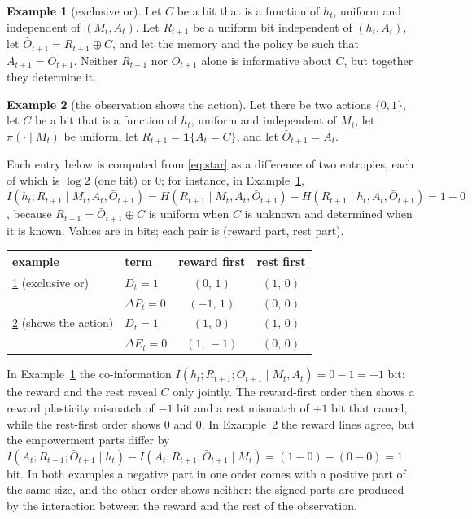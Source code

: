 \documentclass{article}
\theoremstyle{definition}
\newtheorem{example}{Example}
\theoremstyle{remark}
\newcommand{\dE}{\Delta E}
\newcommand{\dP}{\Delta P}
\newcommand{\Ob}{\bar O}
\begin{document}
\begin{example}[exclusive or]\label{ex:xor}
Let $C$ be a bit that is a function of $h_t$, uniform and independent of $(M_t,A_t)$. Let $R_{t+1}$ be a uniform bit independent of $(h_t,A_t)$, let $\Ob_{t+1}=R_{t+1}\oplus C$, and let the memory and the policy be such that $A_{t+1}=\Ob_{t+1}$. Neither $R_{t+1}$ nor $\Ob_{t+1}$ alone is informative about $C$, but together they determine it.
\end{example}

\begin{example}[the observation shows the action]\label{ex:show}
Let there be two actions $\{0,1\}$, let $C$ be a bit that is a function of $h_t$, uniform and independent of $M_t$, let $\pi(\cdot\mid M_t)$ be uniform, let $R_{t+1}=\mathbf 1\{A_t=C\}$, and let $\Ob_{t+1}=A_t$.
\end{example}

Each entry below is computed from \eqref{eq:star} as a difference of two entropies, each of which is $\log2$ (one bit) or $0$; for instance, in Example~\ref{ex:xor}, $I(h_t;R_{t+1}\mid M_t,A_t,\Ob_{t+1})=H(R_{t+1}\mid M_t,A_t,\Ob_{t+1})-H(R_{t+1}\mid h_t,A_t,\Ob_{t+1})=1-0$, because $R_{t+1}=\Ob_{t+1}\oplus C$ is uniform when $C$ is unknown and determined when it is known. Values are in bits; each pair is (reward part, rest part).

\begin{center}
\small
\begin{tabular}{llcc}
\toprule
example & term & reward first & rest first\\
\midrule
\ref{ex:xor} (exclusive or) & $D_t=1$ & $(0,\,1)$ & $(1,\,0)$\\
 & $\dP_t=0$ & $(-1,\,1)$ & $(0,\,0)$\\
\ref{ex:show} (shows the action) & $D_t=1$ & $(1,\,0)$ & $(1,\,0)$\\
 & $\dE_t=0$ & $(1,\,-1)$ & $(0,\,0)$\\
\bottomrule
\end{tabular}
\end{center}

In Example~\ref{ex:xor} the co-information $I(h_t;R_{t+1};\Ob_{t+1}\mid M_t,A_t)=0-1=-1$ bit: the reward and the rest reveal $C$ only jointly. The reward-first order then shows a reward plasticity mismatch of $-1$ bit and a rest mismatch of $+1$ bit that cancel, while the rest-first order shows $0$ and $0$. In Example~\ref{ex:show} the reward lines agree, but the empowerment parts differ by $I(A_t;R_{t+1};\Ob_{t+1}\mid h_t)-I(A_t;R_{t+1};\Ob_{t+1}\mid M_t)=(1-0)-(0-0)=1$ bit. In both examples a negative part in one order comes with a positive part of the same size, and the other order shows neither: the signed parts are produced by the interaction between the reward and the rest of the observation.
\end{document}
